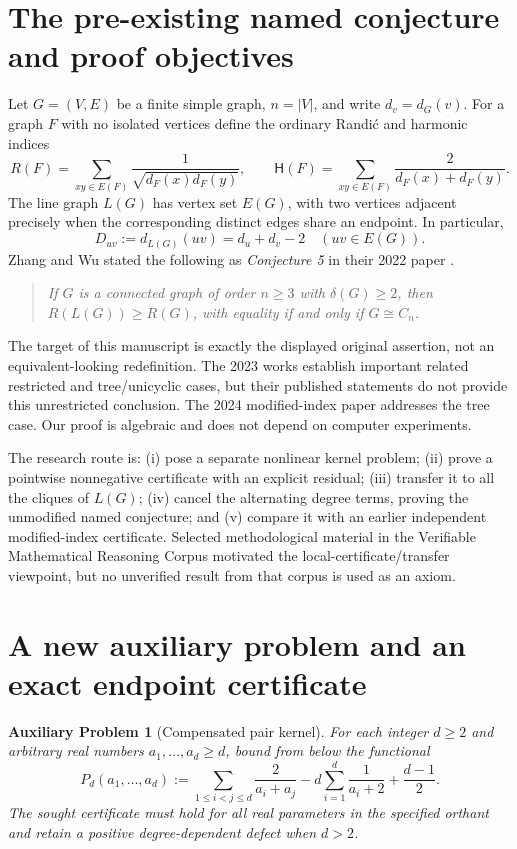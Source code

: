 \documentclass[11pt,a4paper]{article}
\newtheorem{problem}[theorem]{Auxiliary Problem}
\theoremstyle{remark}
\newcommand{\HH}{\mathsf H}
\begin{document}
\section{The pre-existing named conjecture and proof objectives}
Let $G=(V,E)$ be a finite simple graph, $n=|V|$, and write $d_v=d_G(v)$. For a graph $F$ with no isolated vertices define the ordinary Randi\'c and harmonic indices
\begin{equation}\label{eq:indices}
 R(F)=\sum_{xy\in E(F)}\frac1{\sqrt{d_F(x)d_F(y)}},\qquad
 \HH(F)=\sum_{xy\in E(F)}\frac2{d_F(x)+d_F(y)}.
\end{equation}
The line graph $L(G)$ has vertex set $E(G)$, with two vertices adjacent precisely when the corresponding distinct edges share an endpoint. In particular,
\begin{equation}\label{eq:line-degree}
 D_{uv}:=d_{L(G)}(uv)=d_u+d_v-2\quad(uv\in E(G)).
\end{equation}
Zhang and Wu stated the following as \emph{Conjecture 5} in their 2022 paper \cite{ZW22}.
\begin{quote}\itshape
If $G$ is a connected graph of order $n\ge3$ with $\delta(G)\ge2$, then $R(L(G))\ge R(G)$, with equality if and only if $G\cong C_n$.
\end{quote}
The target of this manuscript is exactly the displayed original assertion, not an equivalent-looking redefinition. The 2023 works \cite{LW23,WWW23} establish important related restricted and tree/unicyclic cases, but their published statements do not provide this unrestricted conclusion. The 2024 modified-index paper \cite{ZZ24} addresses the tree case. Our proof is algebraic and does not depend on computer experiments.

The research route is: (i) pose a separate nonlinear kernel problem; (ii) prove a pointwise nonnegative certificate with an explicit residual; (iii) transfer it to all the cliques of $L(G)$; (iv) cancel the alternating degree terms, proving the unmodified named conjecture; and (v) compare it with an earlier independent modified-index certificate. Selected methodological material in the Verifiable Mathematical Reasoning Corpus \cite{VMRC} motivated the local-certificate/transfer viewpoint, but no unverified result from that corpus is used as an axiom.

\section{A new auxiliary problem and an exact endpoint certificate}
\begin{problem}[Compensated pair kernel]\label{prob:kernel}
For each integer $d\ge2$ and arbitrary real numbers $a_1,\ldots,a_d\ge d$, bound from below the functional
\begin{equation}\label{eq:Pd}
 P_d(a_1,\ldots,a_d):=\sum_{1\le i<j\le d}\frac2{a_i+a_j}
 -d\sum_{i=1}^d\frac1{a_i+2}+\frac{d-1}{2}.
\end{equation}
The sought certificate must hold for all real parameters in the specified orthant and retain a positive degree-dependent defect when $d>2$.
\end{problem}
\end{document}
